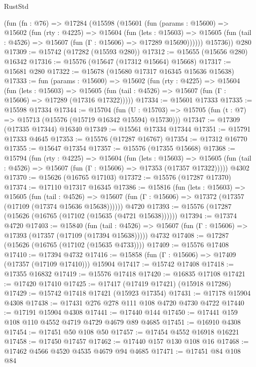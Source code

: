 \begin{lexlean}{RustStd}
\begin{coremodule}
    (fun (fn : @76) =>
    @17284
      (@15598
        (@15601
          (fun (params : @15600) =>
          @15602
            (fun (rty : @4225) =>
            @15604
              (fun (lets : @15603) =>
              @15605 (fun (tail : @4526) => @15607 (fun (Γ : @15606) => @17289 @15690))))))
        @15736))
    @280
@17309 := @15742 (@17282 (@15593 @280))
@17312 := @15655 (@15656 @280) @16342
@17316 := @15576 (@15647 (@17312 @15664) @15668)
@17317 := @15681 @280
@17322 := @15678 (@15680 @17317 @16345 @15636 @15638)
@17333 := fun (params : @15600) =>
  @15602
    (fun (rty : @4225) =>
    @15604
      (fun (lets : @15603) =>
      @15605 (fun (tail : @4526) => @15607 (fun (Γ : @15606) => @17289 (@17316 @17322)))))
@17334 := @15601 @17333
@17335 := @15598 @17334
@17344 := @15704
    (fun (U : @15703) => @15705 (fun (t : @7) => @15713 (@15576 (@15719 @16342 @15594) @15730)))
@17347 := @17309 (@17335 @17344) @16340
@17349 := @15561 @17334 @17344
@17351 := @15791 @17333 @4645
@17353 := @15576 (@17287 @16767)
@17354 := @17312 @16770
@17355 := @15647 @17354
@17357 := @15576 (@17355 @15668)
@17368 := @15794
    (fun (rty : @4225) =>
    @15604
      (fun (lets : @15603) =>
      @15605 (fun (tail : @4526) => @15607 (fun (Γ : @15606) => @17353 (@17357 @17322)))))
    @4302
@17370 := @15626 (@16765 @17103)
@17372 := @15576 (@17287 @17370)
@17374 := @17110 @17317 @16345
@17386 := @15816
    (fun (lets : @15603) =>
    @15605
      (fun (tail : @4526) =>
      @15607 (fun (Γ : @15606) => @17372 (@17357 (@17109 (@17374 @15636 @15638))))))
    @4720
@17393 := @15576 (@17287 (@15626 (@16765 (@17102 (@15635 (@4721 @15638))))))
@17394 := @17374 @4720
@17403 := @15840
    (fun (tail : @4526) => @15607 (fun (Γ : @15606) => @17393 (@17357 (@17109 (@17394 @15638)))))
    @4732
@17408 := @17287 (@15626 (@16765 (@17102 (@15635 @4733))))
@17409 := @15576 @17408
@17410 := @17394 @4732
@17416 := @15858 (fun (Γ : @15606) => @17409 (@17357 (@17109 @17410))) @15904
@17417 := @15742 @17408
@17418 := @17355 @16832
@17419 := @15576 @17418
@17420 := @16835 @17108
@17421 := @17420 @17410
@17425 := @17417 (@17419 @17421) (@15918 @17286)
@17429 := @15742 @17418 @17421 (@15923 @17354)
@17431 := @17178 @15904 @4308
@17438 := @17431 @276 @278 @111 @108 @4720 @4730 @4722
@17440 := @17191 @15904 @4308
@17441 := @17440 @144
@17450 := @17441 @159 @108 @110 @4552 @4719 @4729 @4679 @89 @4685
@17451 := @16910 @4308
@17454 := @17451 @50 @108 @50
@17457 := @17454 @4552 @16918 @16221
@17458 := @17450 @17457
@17462 := @17440 @157 @130 @108 @16
@17468 := @17462 @4566 @4520 @4535 @4679 @94 @4685
@17471 := @17451 @84 @108 @84

\end{coremodule}
\end{lexlean}
